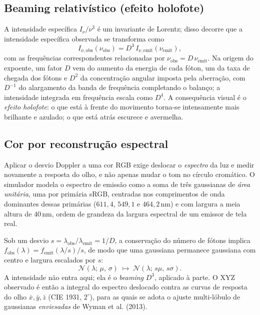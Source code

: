 \documentclass[10pt,a4paper,twocolumn]{article}
\begin{document}
\subsection{Beaming relativístico (efeito holofote)}

A intensidade específica $I_{\nu}/\nu^{3}$ é um invariante de Lorentz; disso decorre que a
intensidade específica observada se transforma como
\begin{equation}
  I_{\nu,\mathrm{obs}}(\nu_{\mathrm{obs}}) = D^{3}\,I_{\nu,\mathrm{emit}}(\nu_{\mathrm{emit}}),
  \label{eq:beaming}
\end{equation}
com as frequências correspondentes relacionadas por $\nu_{\mathrm{obs}} = D\,\nu_{\mathrm{emit}}$.
Na origem do expoente, um fator $D$ vem do aumento da energia de cada fóton, um da taxa de
chegada dos fótons e $D^{2}$ da concentração angular imposta pela aberração, com $D^{-1}$
do alargamento da banda de frequência completando o balanço; a intensidade integrada em
frequência escala como $D^{4}$. A consequência visual é o
\emph{efeito holofote}: o que está à frente do movimento torna-se intensamente mais
brilhante e azulado; o que está atrás escurece e avermelha.

\subsection{Cor por reconstrução espectral}
\label{sec:cor}

Aplicar o desvio Doppler a uma cor RGB exige deslocar o \emph{espectro} da luz e medir
novamente a resposta do olho, e não apenas mudar o tom no círculo cromático. O simulador
modela o espectro de emissão como a soma de três gaussianas de \emph{área unitária}, uma
por primária sRGB, centradas nos comprimentos de onda dominantes dessas primárias
($611{,}4$, $549{,}1$ e $464{,}2\,\mathrm{nm}$) e com largura a meia altura de
$40\,\mathrm{nm}$, ordem de grandeza da largura espectral de um emissor de tela real.

Sob um desvio $s = \lambda_{\mathrm{obs}}/\lambda_{\mathrm{emit}} = 1/D$, a conservação do
número de fótons implica $f_{\mathrm{obs}}(\lambda) = f_{\mathrm{emit}}(\lambda/s)/s$, de
modo que uma gaussiana permanece gaussiana com centro e largura escalados por $s$:
\begin{equation}
  \mathcal{N}(\lambda;\,\mu,\,\sigma) \;\longmapsto\;
  \mathcal{N}(\lambda;\,s\mu,\,s\sigma).
  \label{eq:lobeshift}
\end{equation}
A intensidade não entra aqui; ela é o \emph{beaming} $D^{3}$, aplicado à parte. O XYZ
observado é então a integral do espectro deslocado contra as curvas de resposta do olho
$\bar{x},\bar{y},\bar{z}$ (CIE 1931, $2^{\circ}$), para as quais se adota o ajuste
multi-lóbulo de gaussianas \emph{enviesadas} de Wyman et al. (2013).
\end{document}
